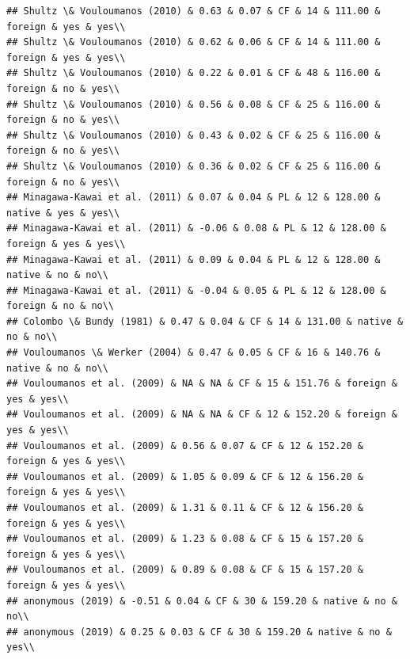 \documentclass[man]{apa6}
\begin{document}
\begin{verbatim}
## Shultz \& Vouloumanos (2010) & 0.63 & 0.07 & CF & 14 & 111.00 & foreign & yes & yes\\
## Shultz \& Vouloumanos (2010) & 0.62 & 0.06 & CF & 14 & 111.00 & foreign & yes & yes\\
## Shultz \& Vouloumanos (2010) & 0.22 & 0.01 & CF & 48 & 116.00 & foreign & no & yes\\
## Shultz \& Vouloumanos (2010) & 0.56 & 0.08 & CF & 25 & 116.00 & foreign & no & yes\\
## Shultz \& Vouloumanos (2010) & 0.43 & 0.02 & CF & 25 & 116.00 & foreign & no & yes\\
## Shultz \& Vouloumanos (2010) & 0.36 & 0.02 & CF & 25 & 116.00 & foreign & no & yes\\
## Minagawa-Kawai et al. (2011) & 0.07 & 0.04 & PL & 12 & 128.00 & native & yes & yes\\
## Minagawa-Kawai et al. (2011) & -0.06 & 0.08 & PL & 12 & 128.00 & foreign & yes & yes\\
## Minagawa-Kawai et al. (2011) & 0.09 & 0.04 & PL & 12 & 128.00 & native & no & no\\
## Minagawa-Kawai et al. (2011) & -0.04 & 0.05 & PL & 12 & 128.00 & foreign & no & no\\
## Colombo \& Bundy (1981) & 0.47 & 0.04 & CF & 14 & 131.00 & native & no & no\\
## Vouloumanos \& Werker (2004) & 0.47 & 0.05 & CF & 16 & 140.76 & native & no & no\\
## Vouloumanos et al. (2009) & NA & NA & CF & 15 & 151.76 & foreign & yes & yes\\
## Vouloumanos et al. (2009) & NA & NA & CF & 12 & 152.20 & foreign & yes & yes\\
## Vouloumanos et al. (2009) & 0.56 & 0.07 & CF & 12 & 152.20 & foreign & yes & yes\\
## Vouloumanos et al. (2009) & 1.05 & 0.09 & CF & 12 & 156.20 & foreign & yes & yes\\
## Vouloumanos et al. (2009) & 1.31 & 0.11 & CF & 12 & 156.20 & foreign & yes & yes\\
## Vouloumanos et al. (2009) & 1.23 & 0.08 & CF & 15 & 157.20 & foreign & yes & yes\\
## Vouloumanos et al. (2009) & 0.89 & 0.08 & CF & 15 & 157.20 & foreign & yes & yes\\
## anonymous (2019) & -0.51 & 0.04 & CF & 30 & 159.20 & native & no & no\\
## anonymous (2019) & 0.25 & 0.03 & CF & 30 & 159.20 & native & no & yes\\

\end{verbatim}
\end{document}
